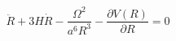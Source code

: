 \begin{equation}
\ddot{R}+3H\dot{R}-\frac{\Omega^{2}}{a^{6}R^{3}}-\frac{\partial
V(R)}{\partial R}=0
\end{equation}

